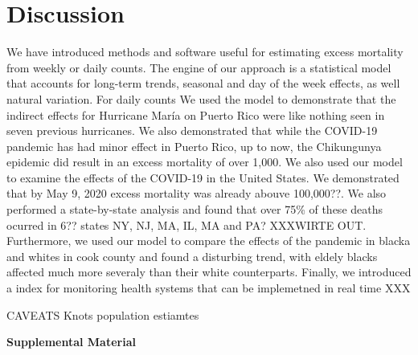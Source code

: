 \documentclass[11pt]{article}
\begin{document}
\section{Discussion}

We have introduced methods and software useful for estimating excess mortality from weekly or daily counts. The engine of our approach is a statistical model that accounts for long-term trends, seasonal and day of the week effects, as well natural variation. For daily counts 
We used the model to demonstrate that the indirect effects for Hurricane María on Puerto Rico were like nothing seen in seven previous hurricanes. We also demonstrated that while the COVID-19 pandemic has had minor effect in Puerto Rico, up to now, the  Chikungunya epidemic did result in an excess mortality of over 1,000. We also used our model to examine the effects of the COVID-19 in the United States. We demonstrated that by May 9, 2020 excess mortality was already abouve 100,000??. We also performed a state-by-state analysis and found that over 75\% of these deaths ocurred in 6?? states NY, NJ, MA, IL, MA and PA? XXXWIRTE OUT. Furthermore, we used our model to compare the effects of the pandemic in blacka and whites in cook county and found a disturbing trend, with eldely blacks affected much more severaly than their white counterparts. Finally, we introduced a index for monitoring health systems that can be implemetned in real time XXX

CAVEATS
Knots
population estiamtes







\newpage



\newpage
\begin{center}
\LARGE{\textbf{Supplemental Material}}
\end{center}
\end{document}
